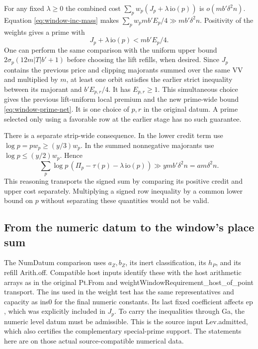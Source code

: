 \documentclass[12pt,letterpaper]{article}
\DeclareRobustCommand{\id}[1]{\mbox{\small\ttfamily #1}}
\begin{document}
For any fixed \(\lambda\ge0\) the combined cost \(\sum_p w_p(J_p+\lambda\,\mathrm{io}(p))\) is \(o(m b'\delta^2n)\). Equation \eqref{eq:window-inc-mass} makes \(\sum_p w_p m b'E_p/4\gg m b'\delta^2n\). Positivity of the weights gives a prime with
\[
                  J_p+\lambda\,\mathrm{io}(p)<m b'E_p/4 .
\]
One can perform the same comparison with the uniform upper bound \(2\sigma_p(12m|T|b'+1)\) before choosing the lift refills, when desired. Since \(J_p\) contains the previous price and clipping majorants summed over the same \id{VV} and multiplied by \(m\), at least one orbit satisfies the earlier strict inequality between its majorant and \(b'E_{p,r}/4\). It has \(E_{p,r}\ge1\). This simultaneous choice gives the previous lift-uniform local premium and the new prime-wide bound \eqref{eq:window-prime-net}. It is one choice of \(p,r\) in the original datum. A prime selected only using a favorable row at the earlier stage has no such guarantee.

There is a separate strip-wide consequence. In the lower credit term use \(\log p=p w_p\ge (y/3)w_p\). In the summed nonnegative majorants use \(\log p\le(y/2)w_p\). Hence
\[
 \sum_p \log p\,(\Pi_p-\tau(p)-\lambda\,\mathrm{io}(p))
                    \gg y m b'\delta^2n = a m\delta^2n .
\]
This reasoning transports the signed sum by comparing its positive credit and upper cost separately. Multiplying a signed row inequality by a common lower bound on \(p\) without separating these quantities would not be valid.

\subsection{From the numeric datum to the window's place sum}

The \id{NumDatum} comparison uses \(a_Z,b_Z\), its inert classification, its \(h_P\), and its refill \id{Arith.off}. Compatible host inputs identify these with the host arithmetic arrays as in the original \id{Pt.From} and \id{weightWindowRequirement\_host\_of\_point} transport. The \id{ins} used in the weight test has the same representatives and capacity as \id{ins0} for the final numeric constants. Its last fixed coefficient affects \(\mathrm{ep}\), which was explicitly included in \(J_p\). To carry the inequalities through \id{Ga}, the numeric level datum must be admissible. This is the source input \id{Lev.admitted}, which also certifies the complementary special-prime support. The statements here are on those actual source-compatible numerical data.
\end{document}
